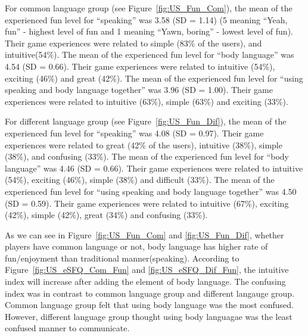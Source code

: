For common language group (see Figure~\ref{fig:US_Fun_Com}), the mean of the experienced fun level for ``speaking'' was 3.58 (SD = 1.14) (5 meaning ``Yeah, fun'' - highest level of fun and 1 meaning ``Yawn, boring'' - lowest level of fun). Their game experiences were related to simple (83\% of the users), and intuitive(54\%). The mean of the experienced fun level for ``body language'' was 4.54 (SD = 0.66). Their game experiences were related to intuitive (54\%), exciting (46\%) and great (42\%). The mean of the experienced fun level for ``using speaking and body language together'' was 3.96 (SD = 1.00). Their game experiences were related to intuitive (63\%), simple (63\%) and exciting (33\%). 

For different language group (see Figure~\ref{fig:US_Fun_Dif}), the mean of the experienced fun level for ``speaking'' was 4.08 (SD = 0.97). Their game experiences were related to great (42\% of the users), intuitive (38\%), simple (38\%), and confusing (33\%). The mean of the experienced fun level for ``body language'' was 4.46 (SD = 0.66). Their game experiences were related to intuitive (54\%), exciting (46\%), simple (38\%) and difficult (33\%). The mean of the experienced fun level for ``using speaking and body language together'' was 4.50 (SD = 0.59). Their game experiences were related to intuitive (67\%), exciting (42\%), simple (42\%), great (34\%) and confusing (33\%).


As we can see in Figure~\ref{fig:US_Fun_Com} and \ref{fig:US_Fun_Dif}, whether players have common language or not, body language has higher rate of fun/enjoyment than traditional manner(speaking). According to Figure~\ref{fig:US_eSFQ_Com_Fun} and \ref{fig:US_eSFQ_Dif_Fun}, the intuitive index will increase after adding the element of body language. The confusing index was in contrast to common language group and different langauge group. Common language group felt that using body language was the most confused. However, different language group thought using body languagae was the least confused manner to communicate.

